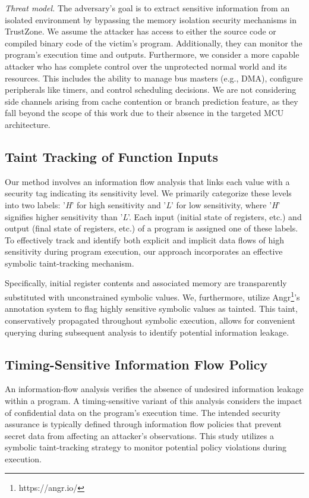\textit{Threat model.} The adversary’s goal is to extract sensitive information from an isolated environment by bypassing the memory isolation security mechanisms in TrustZone. We assume the attacker has access to either the source code or compiled binary code of the victim's program. Additionally, they can monitor the program's execution time and outputs. Furthermore, we consider a more capable attacker who has complete control over the unprotected normal world and its resources. This includes the ability to manage bus masters (e.g., DMA), configure peripherals like timers, and control scheduling decisions. We are not considering side channels arising from cache contention or branch prediction feature, as they fall beyond the scope of this work due to their absence in the targeted MCU architecture.

\subsection{Taint Tracking of Function Inputs}

Our method involves an information flow analysis that links each value with a security tag indicating its sensitivity level. We primarily categorize these levels into two labels: '\textit{H}' for high sensitivity and '\textit{L}' for low sensitivity, where '\textit{H}' signifies higher sensitivity than '\textit{L}'. Each input (initial state of registers, etc.) and output (final state of registers, etc.) of a program is assigned one of these labels. To effectively track and identify both explicit and implicit data flows of high sensitivity during program execution, our approach incorporates an effective symbolic taint-tracking mechanism.

Specifically, initial register contents and associated memory are transparently substituted with unconstrained symbolic values. We, furthermore, utilize Angr\footnote{https://angr.io/}’s annotation system to flag highly sensitive symbolic values as tainted. This taint, conservatively propagated throughout symbolic execution, allows for convenient querying during subsequent analysis to identify potential information leakage. 

\subsection{Timing-Sensitive Information Flow Policy}

An information-flow analysis verifies the absence of undesired information leakage within a program. A timing-sensitive variant of this analysis considers the impact of confidential data on the program's execution time. The intended security assurance is typically defined through information flow policies that prevent secret data from affecting an attacker's observations. This study utilizes a symbolic taint-tracking strategy to monitor potential policy violations during execution.


